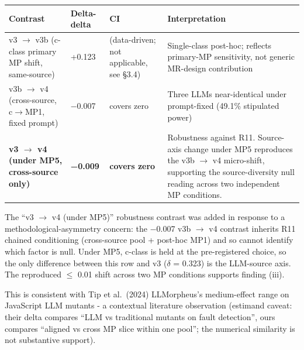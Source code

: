 \documentclass[review,12pt,authoryear]{elsarticle}
\newcounter{none}                   %
\begin{document}
{\def\LTcaptype{none} %
\begin{longtable}[]{@{}
  >{\raggedright\arraybackslash}p{}
  >{\raggedright\arraybackslash}p{}
  >{\raggedright\arraybackslash}p{}
  >{\raggedright\arraybackslash}p{}@{}}
\toprule\noalign{}
\begin{minipage}[b]{\linewidth}\raggedright
Contrast
\end{minipage} & \begin{minipage}[b]{\linewidth}\raggedright
Delta-delta
\end{minipage} & \begin{minipage}[b]{\linewidth}\raggedright
CI
\end{minipage} & \begin{minipage}[b]{\linewidth}\raggedright
Interpretation
\end{minipage} \\
\midrule\noalign{}
\endhead
\bottomrule\noalign{}
\endlastfoot
v3 $\to$ v3b (c-class primary MP shift, same-source) & +0.123 &
(data-driven; not applicable, see §3.4) & Single-class post-hoc;
reflects primary-MP sensitivity, not generic MR-design contribution \\
v3b $\to$ v4 (cross-source, c$\to$MP1, fixed prompt) & −0.007 & covers zero &
Three LLMs near-identical under prompt-fixed (49.1\% stipulated
power) \\
\textbf{v3 $\to$ v4 (under MP5, cross-source only)} & \textbf{−0.009} &
\textbf{covers zero} & Robustness against R11. Source-axis change under
MP5 reproduces the v3b $\to$ v4 micro-shift, supporting the source-diversity
null reading across two independent MP conditions. \\
\end{longtable}
}

The ``v3 $\to$ v4 (under MP5)'' robustness contrast was added in response to
a methodological-asymmetry concern: the −0.007 v3b $\to$ v4 contrast
inherits R11 chained conditioning (cross-source pool + post-hoc MP1) and
so cannot identify which factor is null. Under MP5, c-class is held at
the pre-registered choice, so the only difference between this row and
v3 ($\delta$ = 0.323) is the LLM-source axis. The reproduced $\leq$ 0.01 shift
across two MP conditions supports finding (iii).

This is consistent with Tip et al.~(2024) LLMorpheus's medium-effect
range on JavaScript LLM mutants - a contextual literature observation
(estimand caveat: their delta compares ``LLM vs traditional mutants on
fault detection'', ours compares ``aligned vs cross MP slice within one
pool''; the numerical similarity is not substantive support).
\end{document}
